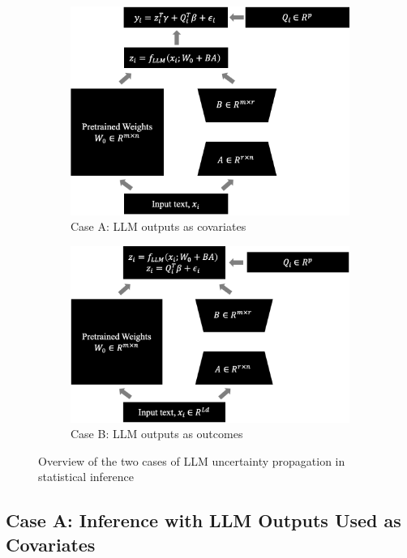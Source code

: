 \documentclass[11pt]{article}
\begin{document}
\begin{figure}[h]
\centering
\begin{subfigure}[b]{0.48\textwidth}
    \includegraphics[width=\textwidth]{images/case1_diagram.png}
    \caption{Case A: LLM outputs as covariates}
    \label{fig:case1}
\end{subfigure}
\hfill
\begin{subfigure}[b]{0.48\textwidth}
    \includegraphics[width=\textwidth]{images/case2_diagram.png}
    \caption{Case B: LLM outputs as outcomes}
    \label{fig:case2}
\end{subfigure}
\caption{Overview of the two cases of LLM uncertainty propagation in statistical inference}
\label{fig:both_cases}
\end{figure}

\subsection{Case A: Inference with LLM Outputs Used as Covariates}
\end{document}

